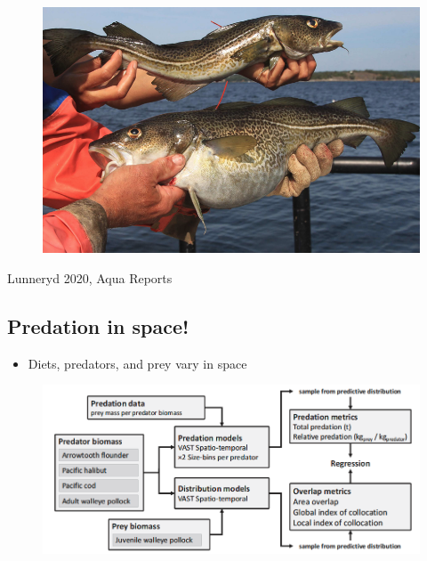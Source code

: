 \documentclass[
  letterpaper,
  DIV=11,
  numbers=noendperiod]{scrartcl}
\providecommand{\tightlist}{%
  \setlength{\itemsep}{0pt}\setlength{\parskip}{0pt}}\usepackage{longtable,booktabs,array}
\begin{document}
\begin{figure}

{\centering \includegraphics{images/skinny_cod.png}

}

\end{figure}

Lunneryd 2020, Aqua Reports

\hypertarget{predation-in-space}{%
\subsection{Predation in space!}\label{predation-in-space}}

\begin{itemize}
\tightlist
\item
  Diets, predators, and prey vary in space
\end{itemize}

\begin{figure}

{\centering \includegraphics{images/goodman1.png}

}

\end{figure}
\end{document}
